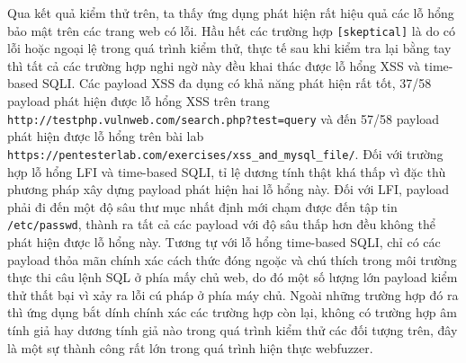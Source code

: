 Qua kết quả kiểm thử trên, ta thấy ứng dụng phát hiện rất hiệu quả các lỗ hổng bảo mật trên các trang web có lỗi. Hầu hết các trường hợp \texttt{[skeptical]} là do có lỗi hoặc ngoại lệ trong quá trình kiểm thử, thực tế sau khi kiểm tra lại bằng tay thì tất cả các trường hợp nghi ngờ này đều khai thác được lỗ hổng XSS và time-based SQLI. Các payload XSS đa dụng có khả năng phát hiện rất tốt, 37/58 payload phát hiện được lỗ hổng XSS trên trang \texttt{http://testphp.vulnweb.com/search.php?test=query} và đến 57/58 payload phát hiện được lỗ hổng trên bài lab \texttt{https://pentesterlab.com/exercises/xss\_and\_mysql\_file/}. Đối với trường hợp lỗ hổng LFI và time-based SQLI, tỉ lệ dương tính thật khá thấp vì đặc thù phương pháp xây dựng payload phát hiện hai lỗ hổng này. Đối với LFI, payload phải đi đến một độ sâu thư mục nhất định mới chạm được đến tập tin \texttt{/etc/passwd}, thành ra tất cả các payload với độ sâu thấp hơn đều không thể phát hiện được lỗ hổng này. Tương tự với lỗ hổng time-based SQLI, chỉ có các payload thỏa mãn chính xác cách thức đóng ngoặc và chú thích trong môi trường thực thi câu lệnh SQL ở phía mấy chủ web, do đó một số lượng lớn payload kiểm thử thất bại vì xảy ra lỗi cú pháp ở phía máy chủ. Ngoài những trường hợp đó ra thì ứng dụng bắt dính chính xác các trường hợp còn lại, không có trường hợp âm tính giả hay dương tính giả nào trong quá trình kiểm thử các đối tượng trên, đây là một sự thành công rất lớn trong quá trình hiện thực webfuzzer.

